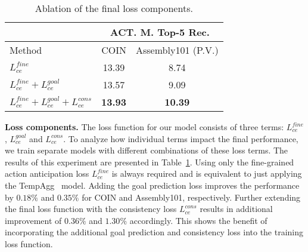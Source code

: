 \documentclass{article}
\begin{document}
\begin{table}[h!]
    \scriptsize
    \centering
    \begin{tabular}{|l|c|c|}
        \hline
         & \multicolumn{2}{c|}{ACT. M. Top-5 Rec.} \\
         \hline
         Method & COIN & Assembly101 (P.V.)\\
         \hline
         $L_{ce}^{fine}$ & 13.39 & 8.74 \\
         $L_{ce}^{fine} + L_{ce}^{goal}$ & 13.57 & 9.09 \\
         $L_{ce}^{fine} + L_{ce}^{goal} + L_{ce}^{cons}$ & \textbf{13.93} & \textbf{10.39} \\
         \hline
    \end{tabular}
    \caption{\small Ablation of the final loss components.}
    \label{tab:abl_components}
\end{table}

\textbf{Loss components.} The loss function for our model consists of three terms: $L_{ce}^{fine}$, $L_{ce}^{goal}$ and $L_{ce}^{cons}$. To analyze how individual terms impact the final performance, we train separate models with different combinations of these loss terms. The results of this experiment are presented in Table~\ref{tab:abl_components}. Using only the fine-grained action anticipation loss $L_{ce}^{fine}$ is always required and is equivalent to just applying the TempAgg~\cite{sener2022assembly101} model. Adding the goal prediction loss improves the performance by $0.18\%$ and $0.35\%$ for COIN and Assembly101, respectively. Further extending the final loss function with the consistency loss $L_{ce}^{cons}$ results in additional improvement of $0.36\%$ and $1.30\%$ accordingly. This shows the benefit of incorporating the additional goal prediction and consistency loss into the training loss function.
\end{document}
